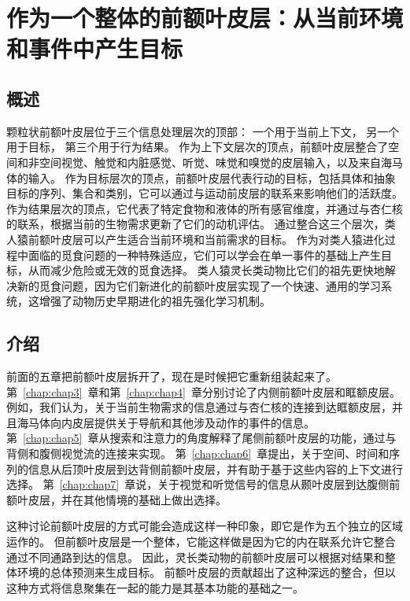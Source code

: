 \chapter{作为一个整体的前额叶皮层：从当前环境和事件中产生目标} \label{chap:chap8}

\section{概述}

颗粒状前额叶皮层位于三个信息处理层次的顶部：
一个用于当前上下文，
另一个用于目标，
第三个用于行为结果。
作为上下文层次的顶点，前额叶皮层整合了空间和非空间视觉、触觉和内脏感觉、听觉、味觉和嗅觉的皮层输入，以及来自海马体的输入。
作为目标层次的顶点，前额叶皮层代表行动的目标，包括具体和抽象目标的序列、集合和类别，它可以通过与运动前皮层的联系来影响他们的活跃度。
作为结果层次的顶点，它代表了特定食物和液体的所有感官维度，并通过与杏仁核的联系，根据当前的生物需求更新了它们的动机评估。
通过整合这三个层次，类人猿前额叶皮层可以产生适合当前环境和当前需求的目标。
作为对类人猿进化过程中面临的觅食问题的一种特殊适应，它们可以学会在单一事件的基础上产生目标，从而减少危险或无效的觅食选择。
类人猿灵长类动物比它们的祖先更快地解决新的觅食问题，因为它们新进化的前额叶皮层实现了一个快速、通用的学习系统，这增强了动物历史早期进化的祖先强化学习机制。



\section{介绍}
\par

前面的五章把前额叶皮层拆开了，现在是时候把它重新组装起来了。
第~\ref{chap:chap3}~章和第~\ref{chap:chap4}~章分别讨论了内侧前额叶皮层和眶额皮层。
例如，我们认为，关于当前生物需求的信息通过与杏仁核的连接到达眶额皮层，并且海马体向内皮层提供关于导航和其他涉及动作的事件的信息。
第~\ref{chap:chap5}~章从搜索和注意力的角度解释了尾侧前额叶皮层的功能，通过与背侧和腹侧视觉流的连接来实现。
第~\ref{chap:chap6}~章提出，关于空间、时间和序列的信息从后顶叶皮层到达背侧前额叶皮层，并有助于基于这些内容的上下文进行选择。
第~\ref{chap:chap7}~章说，关于视觉和听觉信号的信息从颞叶皮层到达腹侧前额叶皮层，并在其他情境的基础上做出选择。
\par


这种讨论前额叶皮层的方式可能会造成这样一种印象，即它是作为五个独立的区域运作的。
但前额叶皮层是一个整体，它能这样做是因为它的内在联系允许它整合通过不同通路到达的信息。
因此，灵长类动物的前额叶皮层可以根据对结果和整体环境的总体预测来生成目标。
前额叶皮层的贡献超出了这种深远的整合，但以这种方式将信息聚集在一起的能力是其基本功能的基础之一。
\par


